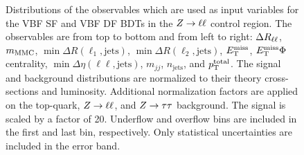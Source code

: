 \begin{figure}[htb]
\begin{subfigure}[t]{0.3\textwidth}
    \end{subfigure}
    \caption{Distributions of the observables which are used as input variables for the VBF SF and VBF DF BDTs in the $Z \to \ell \ell$ control region.
             The observables are from top to bottom and from left to right: $\Delta R_{\ell\ell}$, $m_\text{MMC}$, $\min \Delta R (\ell_1, \text{jets})$, $\min \Delta R (\ell_2, \text{jets})$,
             $E_\text{T}^\text{miss}$, $E_\text{T}^\text{miss} \Phi$ centrality, $\min \Delta \eta (\ell\ell, \text{jets})$, $m_{jj}$, $n_\text{jets}$, and $p_\text{T}^\text{total}$.
             The signal and background distributions are normalized to their theory cross-sections and luminosity.
             Additional normalization factors are applied on the top-quark, $Z \to \ell \ell$, and $Z \to \tau \tau$ background.
             The signal is scaled by a factor of 20.
             Underflow and overflow bins are included in the first and last bin, respectively.
             Only statistical uncertainties are included in the error band.}\label{fig:mva:modeling:cr:vbfzll}
\end{figure}

